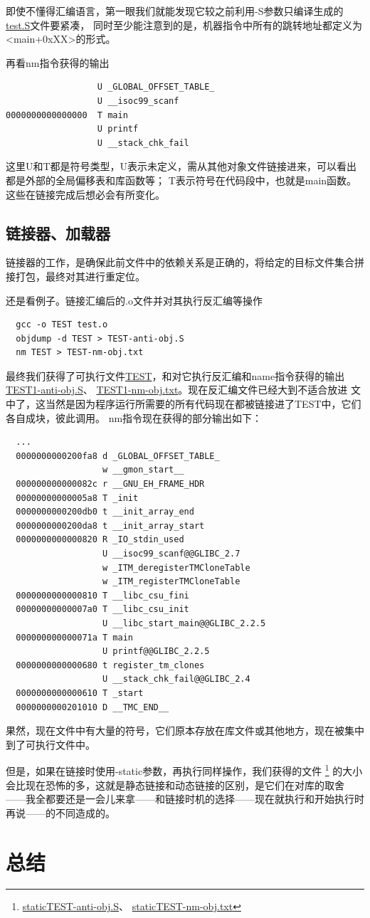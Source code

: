 \documentclass[UTF8,a4paper,10pt]{ctexart}
\begin{document}
即使不懂得汇编语言，第一眼我们就能发现它较之前利用-S参数只编译生成的
\href{run:./test/test.S}{test.S}文件要紧凑，
同时至少能注意到的是，机器指令中所有的跳转地址都定义为<main+0xXX>的形式。
\par
再看nm指令获得的输出
\begin{lstlisting}
                  U _GLOBAL_OFFSET_TABLE_
                  U __isoc99_scanf
0000000000000000  T main
                  U printf
                  U __stack_chk_fail
\end{lstlisting}
这里U和T都是符号类型，U表示未定义，需从其他对象文件链接进来，可以看出都是外部的全局偏移表和库函数等；
T表示符号在代码段中，也就是main函数。这些在链接完成后想必会有所变化。

\subsection{链接器、加载器}
链接器的工作，是确保此前文件中的依赖关系是正确的，将给定的目标文件集合拼接打包，最终对其进行重定位。
\par
还是看例子。链接汇编后的.o文件并对其执行反汇编等操作
\begin{lstlisting}
  gcc -o TEST test.o
  objdump -d TEST > TEST-anti-obj.S
  nm TEST > TEST-nm-obj.txt
\end{lstlisting}
最终我们获得了可执行文件\href{run:./test/TEST}{TEST}，和对它执行反汇编和name指令获得的输出
\href{run:./test/TEST1-anti-obj.S}{TEST1-anti-obj.S}、
\href{run:./test/TEST1-nm-obj.txt}{TEST1-nm-obj.txt}。现在反汇编文件已经大到不适合放进
文中了，这当然是因为程序运行所需要的所有代码现在都被链接进了TEST中，它们各自成块，彼此调用。
nm指令现在获得的部分输出如下：
\begin{lstlisting}
  ...
  0000000000200fa8 d _GLOBAL_OFFSET_TABLE_
                   w __gmon_start__
  000000000000082c r __GNU_EH_FRAME_HDR
  00000000000005a8 T _init
  0000000000200db0 t __init_array_end
  0000000000200da8 t __init_array_start
  0000000000000820 R _IO_stdin_used
                   U __isoc99_scanf@@GLIBC_2.7
                   w _ITM_deregisterTMCloneTable
                   w _ITM_registerTMCloneTable
  0000000000000810 T __libc_csu_fini
  00000000000007a0 T __libc_csu_init
                   U __libc_start_main@@GLIBC_2.2.5
  000000000000071a T main
                   U printf@@GLIBC_2.2.5
  0000000000000680 t register_tm_clones
                   U __stack_chk_fail@@GLIBC_2.4
  0000000000000610 T _start
  0000000000201010 D __TMC_END__  
\end{lstlisting}
果然，现在文件中有大量的符号，它们原本存放在库文件或其他地方，现在被集中到了可执行文件中。
\par
但是，如果在链接时使用-static参数，再执行同样操作，我们获得的文件
\footnote{\href{run:./test/staticTEST-anti-obj.S}{staticTEST-anti-obj.S}、
\href{run:./test/staticTEST-nm-obj.txt}{staticTEST-nm-obj.txt}}
的大小会比现在恐怖的多，这就是静态链接和动态链接的区别，是它们在对库的取舍
——我全都要还是一会儿来拿——和链接时机的选择——现在就执行和开始执行时再说——的不同造成的。

\section{总结}


\newpage

 
\end{document}
